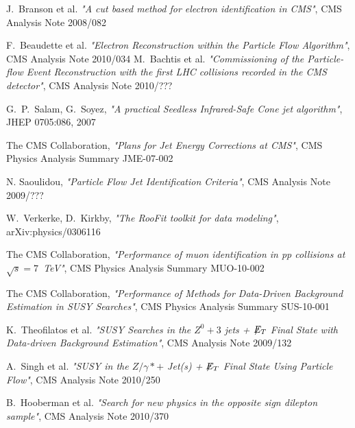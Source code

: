 \documentclass{cmspaper}
\newcommand{\MET}{\ensuremath{\displaystyle{\not} E_T~}}
\begin{document}
\begin{thebibliography}{9}
     J.~Branson et al. {\em "A cut based method for electron identification in CMS"}, CMS Analysis Note 2008/082

     F.~Beaudette et al. {\em "Electron Reconstruction within the Particle Flow Algorithm"}, CMS Analysis Note 2010/034
     M.~Bachtis et al. {\em "Commissioning of
        the Particle-flow Event Reconstruction with the first LHC
        collisions recorded in the CMS detector"}, CMS Analysis Note 2010/???
     
     G.~P.~Salam, G.~Soyez, {\em "A practical Seedless Infrared-Safe Cone jet algorithm"}, JHEP 0705:086, 2007 
    
     The CMS Collaboration, {\em "Plans for Jet Energy Corrections at CMS"}, CMS Physics Analysis Summary JME-07-002
   
    N. Saoulidou, {\em "Particle Flow Jet
        Identification Criteria"}, CMS Analysis Note 2009/???

     W.~Verkerke, D.~Kirkby, {\em "The RooFit toolkit for data modeling"}, arXiv:physics/0306116
    
     The CMS Collaboration, {\em "Performance of muon identification in pp collisions at $\sqrt{s}= 7$~TeV"}, CMS Physics Analysis Summary MUO-10-002

     The CMS Collaboration, {\em "Performance of Methods for Data-Driven Background Estimation in SUSY Searches"}, CMS Physics Analysis Summary SUS-10-001
    
     K.~Theofilatos et al. {\em "SUSY Searches in the $Z^0+3$ jets + \MET Final State with Data-driven Background Estimation"}, CMS Analysis Note 2009/132
    
      A.~Singh et al. {\em "SUSY in the $Z/\gamma*+$ Jet(s) + \MET Final State Using Particle Flow"}, CMS Analysis Note 2010/250
    
     B.~Hooberman et al. {\em "Search for new physics in the opposite sign dilepton sample"}, CMS Analysis Note 2010/370

    

\end{thebibliography}
\end{document}
